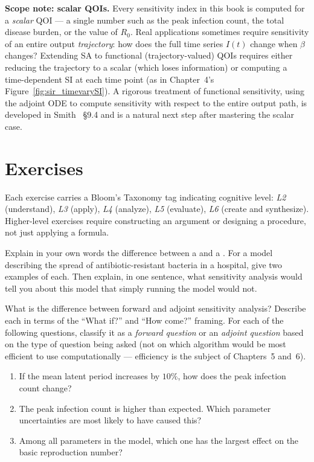\noindent\textbf{Scope note: scalar QOIs.}
Every sensitivity index in this book is computed for a
\emph{scalar} QOI --- a single number such as the peak infection
count, the total disease burden, or the value of $R_0$.
Real applications sometimes require sensitivity of an entire output
\emph{trajectory}: how does the full time series $I(t)$ change when
$\beta$ changes?
Extending SA to functional (trajectory-valued) QOIs requires either
reducing the trajectory to a scalar (which loses information) or
computing a time-dependent SI at each time point (as in Chapter~4's
Figure~\ref{fig:sir_timevarySI}).
A rigorous treatment of functional sensitivity, using the adjoint ODE
to compute sensitivity with respect to the entire output path, is
developed in Smith~\cite{smith2014uncertainty} \S9.4 and is a natural
next step after mastering the scalar case.

\section{Exercises}

Each exercise carries a Bloom's Taxonomy tag indicating cognitive level:
\textit{L2} (understand), \textit{L3} (apply), \textit{L4} (analyze),
\textit{L5} (evaluate), \textit{L6} (create and synthesize).
Higher-level exercises require constructing an argument or designing a procedure,
not just applying a formula.

\begin{exercise}[\bloom{L2}]
\label{ex:ch1:vocabulary}
Explain in your own words the difference between a \POI and a \QOI.
For a model describing the spread of antibiotic-resistant bacteria
in a hospital, give two examples of each. Then explain, in one sentence,
what sensitivity analysis would tell you about this model that
simply running the model would not.
\end{exercise}

\begin{exercise}[\bloom{L2}]
\label{ex:ch1:forwardadjoint}
What is the difference between forward and adjoint sensitivity analysis?
Describe each in terms of the ``What if?'' and ``How come?'' framing.
For each of the following questions, classify it as a \emph{forward question}
or an \emph{adjoint question} based on the type of question being asked
(not on which algorithm would be most efficient to use computationally ---
efficiency is the subject of Chapters~5 and~6).
\begin{enumerate}[label=(\alph*)]
  \item If the mean latent period increases by $10\%$, how does the peak
        infection count change?
  \item The peak infection count is higher than expected. Which parameter
        uncertainties are most likely to have caused this?
  \item Among all parameters in the model, which one has the largest
        effect on the basic reproduction number?
\end{enumerate}
\end{exercise}

